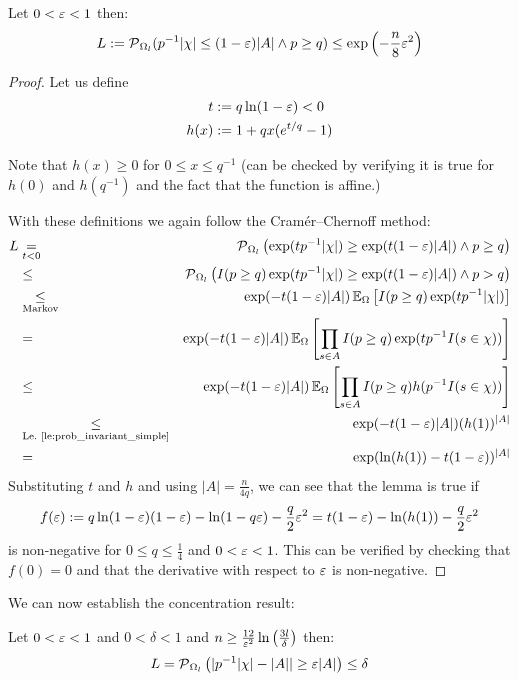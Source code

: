 \begin{lemma}\label{le:lower_tail}
Let $0 < \varepsilon < 1$ then:
\[
  L := \operatorname{\mathcal P}_{\Omega_l} ( p^{-1} |\chi| \leq (1-\varepsilon)|A| \wedge p \geq q) \leq
    \exp\left(-\frac{n}{8} \varepsilon^2\right)
\]
\end{lemma}
\begin{proof}
Let us define
\begin{align*}
  t & := q \ln(1-\varepsilon) < 0 \\
  h(x) & := 1+q x (e^{t/q}-1)  
\end{align*}

Note that $h(x) \geq 0$ for $0 \leq x \leq q^{-1}$ (can be checked by verifying it is true for
$h(0)$ and $h(q^{-1})$ and the fact that the function is affine.)

With these definitions we again follow the Cram\'{e}r--Chernoff method:
{\allowdisplaybreaks
\begin{eqnarray*}
  L & \underset{t<0}{=} & \operatorname{\mathcal P}_{\Omega_l} \left( \exp(t p^{-1} |\chi|) \geq
    \exp(t (1-\varepsilon)|A|) \wedge p \geq q \right) \\
    & \leq & \operatorname{\mathcal P}_{\Omega_l} \left( I(p \geq q) \exp(t p^{-1} |\chi|) \geq
    \exp(t (1-\varepsilon)|A|) \wedge p > q \right) \\
    & \underset{\textrm{Markov}}{\leq} & \exp( -t (1-\varepsilon) |A| )
    \operatorname{\mathbb E}_\Omega \left[ I(p \geq q) \exp ( t p^{-1} |\chi| ) \right] \\
    & = & \exp( -t (1-\varepsilon) |A| ) \operatorname{\mathbb E}_\Omega \left[ \prod_{s \in A} I(p \geq q) 
      \exp ( t p^{-1} I(s \in \chi) ) \right] \\
    & \leq & \exp( -t (1-\varepsilon) |A| ) \operatorname{\mathbb E}_\Omega 
      \left[ \prod_{s \in A} I(p \geq q) h( p^{-1} I(s \in \chi) ) \right] \\
    & \underset{\textrm{Le.~\ref{le:prob_invariant_simple}}}{\leq} & \exp( -t (1-\varepsilon) |A| ) (h(1))^{|A|} \\
    & = & \exp( \ln(h(1)) -t (1-\varepsilon) )^{|A|}
\end{eqnarray*}
}
Substituting $t$ and $h$ and using $|A| = \frac{n}{4q}$, we can see that the lemma is true if
\[
  f(\varepsilon) := q \ln(1-\varepsilon) (1-\varepsilon) -\ln(1 - q \varepsilon) - \frac{q}{2}\varepsilon^2 =
  t (1-\varepsilon) - \ln(h(1)) - \frac{q}{2} \varepsilon^2
\]
is non-negative for $0 \leq q \leq \frac{1}{4}$ and $0 < \varepsilon < 1$.
This can be verified by checking that $f(0) = 0$ and that the derivative with respect to $\varepsilon$ is
non-negative.
\end{proof}
We can now establish the concentration result:
\begin{theorem}\label{th:concentration}
Let $0 < \varepsilon < 1$ and $0 < \delta < 1$ and
$n \geq \frac{12}{\varepsilon^2} \ln\left(\frac{3l}{\delta}\right)$ then:
\[
  L = \operatorname{\mathcal P}_{\Omega_l} \left( | p^{-1} |\chi| - |A| | \geq \varepsilon |A| \right) \leq \delta
\]
\end{theorem}
